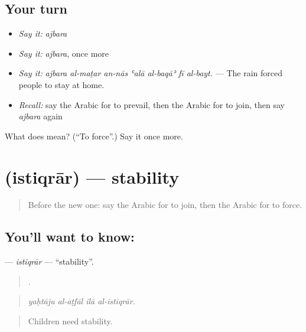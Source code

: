 \subsection*{Your turn}
\begin{itemize}
\raggedright
  \item \emph{Say it:} \emph{ajbara}
  \item \emph{Say it:} \emph{ajbara}, once more
  \item \emph{Say it:} \emph{ajbara al-maṭar an-nās ʿalā al-baqāʾ fī al-bayt.} — The rain forced people to stay at home.
  \item \emph{Recall:} say the Arabic for to prevail, then the Arabic for to join, then say \emph{ajbara} again
\end{itemize}

\begin{tcolorbox}[breakable,colback=teal!4,colframe=teal!35!black,title={Before you move on}]
What does  mean? (\textquotedblleft{}To force\textquotedblright{}.) Say it once more.
\end{tcolorbox}
\section[\texorpdfstring{\ar{استقرار} (istiqrār)}{استقرار (istiqrār)}]{ (istiqrār) — stability}

\label{lesson:AR-C389-istiqrar}



\begin{quote}
Before the new one: say the Arabic for to join, then the Arabic for to force.
\end{quote}

\subsection*{You'll want to know: }
\textbf{} — \emph{istiqrār} — \textquotedblleft{}stability\textquotedblright{}.

\begin{quote}
   .
\end{quote}

\begin{quote}
\emph{yaḥtāju al-aṭfāl ilā al-istiqrār.}
\end{quote}

\begin{quote}
Children need stability.
\end{quote}

